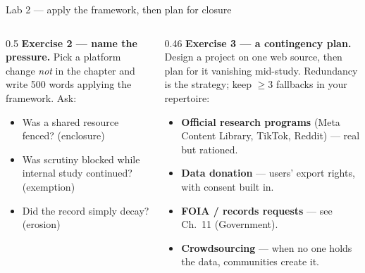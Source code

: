 \documentclass[9pt,aspectratio=169]{beamer}
\begin{document}
\begin{frame}{Lab 2 --- apply the framework, then plan for closure}
    \begin{columns}[T]
        \begin{column}{0.5\textwidth}
            \textbf{Exercise 2 --- name the pressure.} Pick a platform change \textit{not} in the chapter and write 500 words applying the framework. Ask:
            \begin{itemize}\small
                \item Was a shared resource fenced? (\textcolor{tab-blue}{enclosure})
                \item Was scrutiny blocked while internal study continued? (\textcolor{tab-orange}{exemption})
                \item Did the record simply decay? (\textcolor{tab-red}{erosion})
            \end{itemize}
        \end{column}
        \begin{column}{0.46\textwidth}
            \textbf{Exercise 3 --- a contingency plan.} Design a project on one web source, then plan for it vanishing mid-study. Redundancy is the strategy; keep $\geq 3$ fallbacks in your repertoire:
            \begin{itemize}\small
                \item \textbf{Official research programs} (Meta Content Library, TikTok, Reddit) --- real but rationed.
                \item \textbf{Data donation} --- users' export rights, with consent built in.
                \item \textbf{FOIA / records requests} --- see Ch.~11 (Government).
                \item \textbf{Crowdsourcing} --- when no one holds the data, communities create it.
            \end{itemize}
        \end{column}
    \end{columns}
\end{frame}
\end{document}
